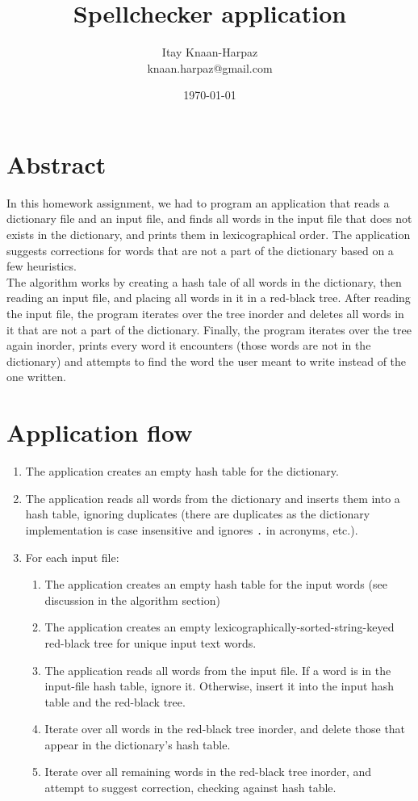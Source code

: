 \documentclass[a4paper]{article}
\title{Spellchecker application}
\author{Itay Knaan-Harpaz\\knaan.harpaz@gmail.com}
\date{\today}
\begin{document}
\maketitle

\section{Abstract}

In this homework assignment, we had to program an application that reads a dictionary file and an input file, and finds all words in the input file that does not exists in the dictionary, and prints them in lexicographical order. The application suggests corrections for words that are not a part of the dictionary based on a few heuristics.\\

The algorithm works by creating a hash tale of all words in the dictionary, then reading an input file, and placing all words in it in a red-black tree. After reading the input file, the program iterates over the tree inorder and deletes all words in it that are not a part of the dictionary. Finally, the program iterates over the tree again inorder, prints every word it encounters (those words are not in the dictionary) and attempts to find the word the user meant to write instead of the one written.\\

\section{Application flow}

\begin{enumerate}
	\item The application creates an empty hash table for the dictionary.
	\item The application reads all words from the dictionary and inserts them into a hash table, ignoring duplicates (there are duplicates as the dictionary implementation is case insensitive and ignores \texttt{.} in acronyms, etc.).
	\item For each input file:
	\begin{enumerate}
		\item The application creates an empty hash table for the input words (see discussion in the algorithm section)
		\item The application creates an empty lexicographically-sorted-string-keyed red-black tree for unique input text words.
		\item The application reads all words from the input file. If a word is in the input-file hash table, ignore it. Otherwise, insert it into the input hash table and the red-black tree.
		\item Iterate over all words in the red-black tree inorder, and delete those that appear in the dictionary's hash table.
		\item Iterate over all remaining words in the red-black tree inorder, and attempt to suggest correction, checking against hash table.
	\end{enumerate}
\end{enumerate}
\end{document}
